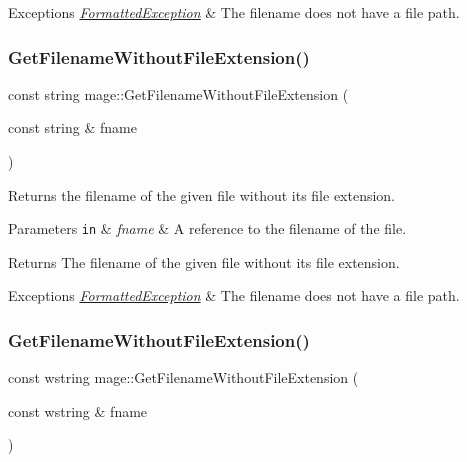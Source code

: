\begin{DoxyExceptions}{Exceptions}
{\em \hyperlink{structmage_1_1_formatted_exception}{Formatted\+Exception}} & The filename does not have a file path. \\
\hline
\end{DoxyExceptions}
\hypertarget{namespacemage_ab8841cbab507ef81edb00278110553ad}{}\label{namespacemage_ab8841cbab507ef81edb00278110553ad} 
\subsubsection{\texorpdfstring{Get\+Filename\+Without\+File\+Extension()}{GetFilenameWithoutFileExtension()}\hspace{0.1cm}{\footnotesize\ttfamily [1/2]}}
{\footnotesize\ttfamily const string mage\+::\+Get\+Filename\+Without\+File\+Extension (\begin{DoxyParamCaption}\item[{const string \&}]{fname }\end{DoxyParamCaption})}

Returns the filename of the given file without its file extension.


\begin{DoxyParams}[1]{Parameters}
\mbox{\tt in}  & {\em fname} & A reference to the filename of the file. \\
\hline
\end{DoxyParams}
\begin{DoxyReturn}{Returns}
The filename of the given file without its file extension. 
\end{DoxyReturn}

\begin{DoxyExceptions}{Exceptions}
{\em \hyperlink{structmage_1_1_formatted_exception}{Formatted\+Exception}} & The filename does not have a file path. \\
\hline
\end{DoxyExceptions}
\hypertarget{namespacemage_aac01c0fba57d6737fcf32155748e95b0}{}\label{namespacemage_aac01c0fba57d6737fcf32155748e95b0} 
\subsubsection{\texorpdfstring{Get\+Filename\+Without\+File\+Extension()}{GetFilenameWithoutFileExtension()}\hspace{0.1cm}{\footnotesize\ttfamily [2/2]}}
{\footnotesize\ttfamily const wstring mage\+::\+Get\+Filename\+Without\+File\+Extension (\begin{DoxyParamCaption}\item[{const wstring \&}]{fname }\end{DoxyParamCaption})}


